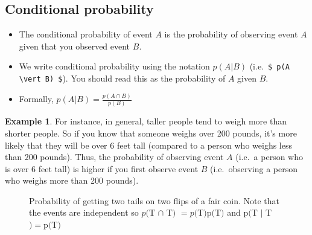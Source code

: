 \documentclass[]{article}
\theoremstyle{definition}
\newtheorem{exmp}{Example}[section]
\begin{document}
\subsection{Conditional probability}

\begin{itemize}
\item The conditional probability of event $A$ is the probability of observing event $A$ given that you observed event $B$. 

\item We write conditional probability using the notation $p(A|B)$ (i.e.\ \verb|$ p(A \vert B) $|). You should read this as the probability of $A$ given $B$.

\item Formally, $p(A \vert B) = \frac{p(A \cap B)}{p(B)}$
\end{itemize}


\begin{exmp}
For instance, in general, taller people tend to weigh more than shorter people. So if you know that someone weighs over 200 pounds, it's more likely that they will be over 6 feet tall (compared to a person who weighs less than 200 pounds). Thus, the probability of observing event $A$ (i.e.\ a person who is over 6 feet tall) is higher if you first observe event $B$ (i.e.\ observing a person who weighs more than 200 pounds).
\end{exmp}

\begin{figure}[h!]%
    \centering
    \qquad
    \caption{Probability of getting two tails on two flips of a fair coin. Note that the events are independent so $p($T $ \cap $ T$)$ $= p($T$)$p$($T$)$ and  p$($T $\vert$ T$)=$p$($T$)$}%
    \label{fig:example}%
\end{figure}
\end{document}
